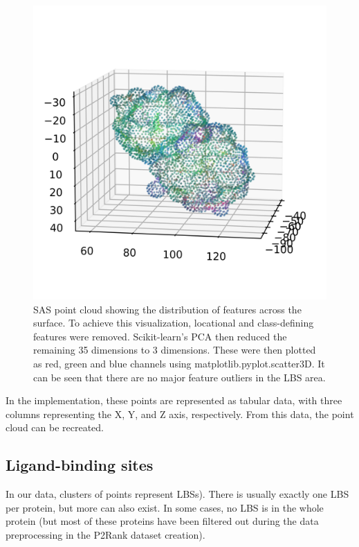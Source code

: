 \begin{figure}
    \centering
    \includegraphics[width=1\linewidth]{point_cloud_pca.png}
    \caption{SAS point cloud showing the distribution of features across the surface. To achieve this visualization, locational and class-defining features were removed. Scikit-learn's PCA then reduced the remaining 35 dimensions to 3 dimensions. These were then plotted as red, green and blue channels using matplotlib.pyplot.scatter3D. It can be seen that there are no major feature outliers in the \ac{LBS} area.}
    \label{fig:pca_point_cloud}
\end{figure}

In the implementation, these points are represented as tabular data, with three columns representing the X, Y, and Z axis, respectively. From this data, the point cloud can be recreated.

\subsection{Ligand-binding sites}

In our data, clusters of points represent \ac{LBS}s). There is usually exactly one LBS per protein, but more can also exist. In some cases, no LBS is in the whole protein (but most of these proteins have been filtered out during the data preprocessing in the P2Rank dataset creation).

